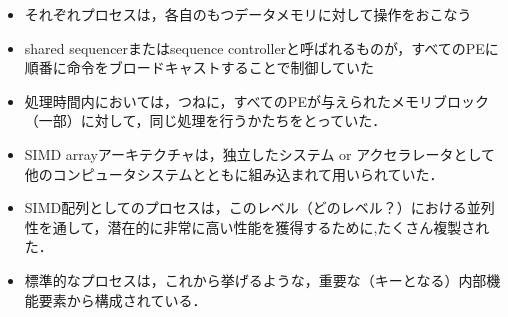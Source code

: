 \documentclass[12pt, unicode, dvipdfmx, t]{beamer}
\begin{document}
\begin{frame}[t]
	\begin{itemize}
		\item それぞれプロセスは，各自のもつデータメモリに対して操作をおこなう
		\item shared sequencerまたはsequence controllerと呼ばれるものが，すべてのPEに順番に命令をブロードキャストすることで制御していた
		\item 処理時間内においては，つねに，すべてのPEが与えられたメモリブロック（一部）に対して，同じ処理を行うかたちをとっていた．
		\item SIMD arrayアーキテクチャは，独立したシステム or	アクセラレータとして他のコンピュータシステムとともに組み込まれて用いられていた．
	\end{itemize}
\end{frame}

\begin{frame}[t]
	\begin{itemize}
		\item SIMD配列としてのプロセスは，このレベル（どのレベル？）における並列性を通して，潜在的に非常に高い性能を獲得するために,たくさん複製された．
		\item 標準的なプロセスは，これから挙げるような，重要な（キーとなる）内部機能要素から構成されている．
	\end{itemize}
\end{frame}
\end{document}
